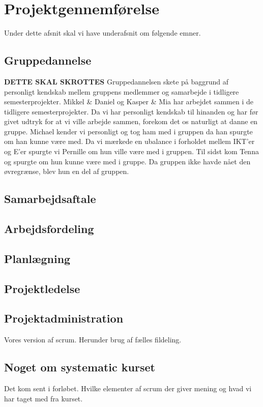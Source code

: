 \chapter{Projektgennemførelse}

Under dette afsnit skal vi have underafsnit om følgende emner.

\section{Gruppedannelse}
	\textbf{DETTE SKAL SKROTTES }
	Gruppedannelsen skete på baggrund af personligt kendskab mellem gruppens medlemmer og samarbejde i tidligere semesterprojekter. Mikkel \& Daniel og Kasper \& Mia har arbejdet sammen i de tidligere semesterprojekter. Da vi har personligt kendskab til hinanden og har før givet udtryk for at vi ville arbejde sammen, forekom det os naturligt at danne en gruppe. Michael kender vi personligt og tog ham med i gruppen da han spurgte om han kunne være med. Da vi mærkede en ubalance i forholdet mellem IKT'er og E'er spurgte vi Pernille om hun ville være med i gruppen. Til sidst kom Tenna og spurgte om hun kunne være med i gruppe. Da gruppen ikke havde nået den øvregrænse, blev hun en del af gruppen. 
\section{Samarbejdsaftale}

\section{Arbejdsfordeling}

\section{Planlægning}

\section{Projektledelse}

\section{Projektadministration}
Vores version af scrum.
Herunder brug af fælles fildeling.

\section{Noget om systematic kurset}
Det kom sent i forløbet. 
Hvilke elementer af scrum der giver mening og hvad vi har taget med fra kurset. 

